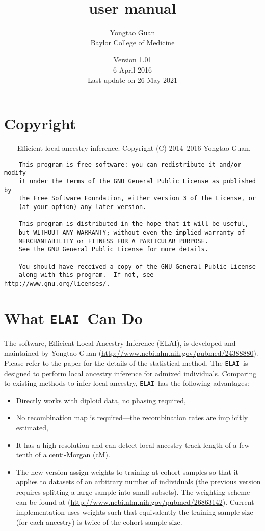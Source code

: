 \documentclass[11pt,Palatino]{article}
\title{ \elai user manual}
\author{Yongtao Guan \\ Baylor College of Medicine}
\date{Version 1.01 \\ 6 April 2016 \\Last update on 26 May 2021}
\def\elai{{\tt{ELAI}}~}
\begin{document}
\maketitle
\tableofcontents
\clearpage

\section{Copyright}

\indent \elai --- Efficient local ancestry inference.
    Copyright (C) 2014--2016 Yongtao Guan. 
\begin{verbatim}
    This program is free software: you can redistribute it and/or modify
    it under the terms of the GNU General Public License as published by
    the Free Software Foundation, either version 3 of the License, or
    (at your option) any later version.

    This program is distributed in the hope that it will be useful,
    but WITHOUT ANY WARRANTY; without even the implied warranty of
    MERCHANTABILITY or FITNESS FOR A PARTICULAR PURPOSE.  
    See the GNU General Public License for more details.

    You should have received a copy of the GNU General Public License
    along with this program.  If not, see http://www.gnu.org/licenses/.
\end{verbatim}


\section{What \elai Can Do}
The software, Efficient Local Ancestry Inference (ELAI), is developed and maintained by Yongtao Guan (\url{http://www.ncbi.nlm.nih.gov/pubmed/24388880}).  Please refer to the paper for the details of the statistical method. The \elai is designed to perform local ancestry inference for admixed individuals. Comparing to existing methods to infer local ancestry, \elai has the following advantages: 
\begin{itemize}
\itemsep-0.05in 
\item Directly works with diploid data, no phasing required, 
\item No recombination map is required---the recombination rates are implicitly estimated, 
\item It has a high resolution and can detect local ancestry track length of a few tenth of a centi-Morgan (cM). 
\item The new version assign weights to training at cohort samples so that it applies to datasets of an arbitrary number of individuals (the previous version requires splitting a large sample into small subsets).  The weighting scheme can be found at (\url{http://www.ncbi.nlm.nih.gov/pubmed/26863142}). Current implementation uses weights such that  equivalently the training sample size (for each ancestry) is twice of the cohort sample size. 
\end{itemize}
\end{document}
